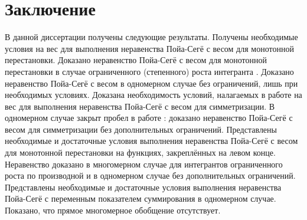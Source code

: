\chapter*{Заключение}						%


%
%


В данной диссертации получены следующие результаты.
Получены необходимые условия на вес для выполнения неравенства Пойа-Сегё с весом для монотонной перестановки.
Доказано неравенство Пойа-Сегё с весом для монотонной перестановки в случае ограниченного (степенного) роста интегранта .
Доказано неравенство Пойа-Сегё с весом в одномерном случае без ограничений, лишь при необходимых условиях.
Доказана необходимость условий, налагаемых в работе \cite{Brock} на вес для выполнения неравенства Пойа-Сегё с весом для симметризации.
В одномерном случае закрыт пробел в работе \cite{Brock}:
доказано неравенство Пойа-Сегё с весом для симметризации без дополнительных ограничений.
Представлены необходимые и достаточные условия выполнения неравенства Пойа-Сегё с весом для монотонной перестановки
на функциях, закреплённых на левом конце.
Неравенство доказано в многомерном случае для интегрантов ограниченного роста по производной
и в одномерном случае без дополнительных ограничений.
Представлены необходимые и достаточные условия выполнения неравенства Пойа-Сегё с переменным показателем
суммирования в одномерном случае.
Показано, что прямое многомерное обобщение отсутствует.
